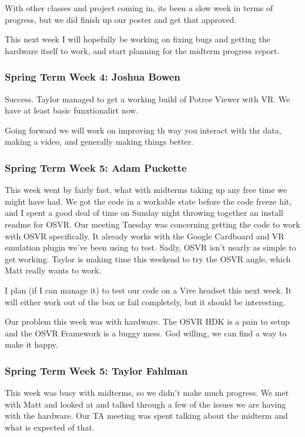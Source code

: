 \documentclass[draftclsnofoot,onecolumn]{IEEEtran}
\begin{document}
With other classes and project coming in, its been a slow week in terms of progress, but we did finish up our poster and get that approved.

This next week I will hopefully be working on fixing bugs and getting the hardware itself to work, and start planning for the midterm progress report.

\subsubsection{Spring Term Week 4: Joshua Bowen}

Success. Taylor managed to get a working build of Potree Viewer with VR. We have at least basic funxtionalirt now.

Going forward we will work on improving th way you interact with thr data, making a video, and generally making things better.

\subsubsection{Spring Term Week 5: Adam Puckette}

This week went by fairly fast, what with midterms taking up any free time we might have had. We got the code in a workable state before the code freeze hit, and I spent a good deal of time on Sunday night throwing together an install readme for OSVR. Our meeting Tuesday was concerning getting the code to work with OSVR specifically. It already works with the Google Cardboard and VR emulation plugin we've been using to test. Sadly, OSVR isn't nearly as simple to get working. Taylor is making time this weekend to try the OSVR angle, which Matt really wants to work.

I plan (if I can manage it) to test our code on a Vive headset this next week. It will either work out of the box or fail completely, but it should be interesting.

Our problem this week was with hardware. The OSVR HDK is a pain to setup and the OSVR Framework is a buggy mess. God willing, we can find a way to make it happy.

\subsubsection{Spring Term Week 5: Taylor Fahlman}

This week was busy with midterms, so we didn't make much progress. We met with Matt and looked at and talked through a few of the issues we are having with the hardware. Our TA meeting was spent talking about the midterm and what is expected of that.
\end{document}

